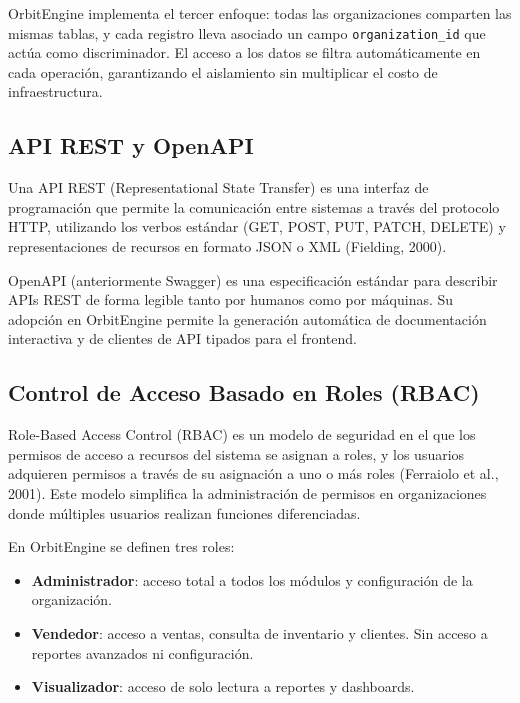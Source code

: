 OrbitEngine implementa el tercer enfoque: todas las organizaciones comparten las mismas tablas, y cada registro lleva asociado un campo \texttt{organization\_id} que actúa como discriminador. El acceso a los datos se filtra automáticamente en cada operación, garantizando el aislamiento sin multiplicar el costo de infraestructura.

\subsection{API REST y OpenAPI}\label{api-rest-y-openapi}

Una API REST (Representational State Transfer) es una interfaz de programación que permite la comunicación entre sistemas a través del protocolo HTTP, utilizando los verbos estándar (GET, POST, PUT, PATCH, DELETE) y representaciones de recursos en formato JSON o XML (Fielding, 2000).

OpenAPI (anteriormente Swagger) es una especificación estándar para describir APIs REST de forma legible tanto por humanos como por máquinas. Su adopción en OrbitEngine permite la generación automática de documentación interactiva y de clientes de API tipados para el frontend.

\subsection{Control de Acceso Basado en Roles (RBAC)}\label{control-de-acceso-basado-en-roles-rbac}

Role-Based Access Control (RBAC) es un modelo de seguridad en el que los permisos de acceso a recursos del sistema se asignan a roles, y los usuarios adquieren permisos a través de su asignación a uno o más roles (Ferraiolo et al., 2001). Este modelo simplifica la administración de permisos en organizaciones donde múltiples usuarios realizan funciones diferenciadas.

En OrbitEngine se definen tres roles:

\begin{itemize}
\tightlist
\item
  \textbf{Administrador}: acceso total a todos los módulos y configuración de la organización.
\item
  \textbf{Vendedor}: acceso a ventas, consulta de inventario y clientes. Sin acceso a reportes avanzados ni configuración.
\item
  \textbf{Visualizador}: acceso de solo lectura a reportes y dashboards.
\end{itemize}

